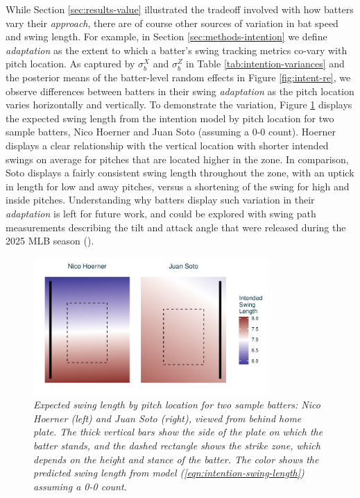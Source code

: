 \documentclass{article}
\begin{document}
    While Section \ref{sec:results-value} illustrated the tradeoff involved with how batters vary their \textit{approach}, there are of course other sources of variation in bat speed and swing length. For example, in Section \ref{sec:methods-intention} we define \textit{adaptation} as the extent to which a batter's swing tracking metrics co-vary with pitch location. As captured by $\sigma_b^X$ and $\sigma_b^Z$ in Table \ref{tab:intention-variances} and the posterior means of the batter-level random effects in Figure \ref{fig:intent-re}, we observe differences between batters in their swing \textit{adaptation} as the pitch location varies horizontally and vertically. To demonstrate the variation, Figure \ref{fig:adaptation} displays the expected swing length from the intention model by pitch location for two sample batters, Nico Hoerner and Juan Soto (assuming a 0-0 count). Hoerner displays a clear relationship with the vertical location with shorter intended swings on average for pitches that are located higher in the zone. In comparison, Soto displays a fairly consistent swing length throughout the zone, with an uptick in length for low and away pitches, versus a shortening of the swing for high and inside pitches. Understanding why batters display such variation in their \textit{adaptation} is left for future work, and could be explored with swing path measurements describing the tilt and attack angle that were released during the 2025 MLB season (\cite{petriello_4_2025}).
    
      \begin{figure}
        \centering
        \includegraphics[width = 0.8\textwidth]{figures/adaptation.pdf}
        \caption{\it Expected swing length by pitch location for two sample batters: Nico Hoerner (left) and Juan Soto (right), viewed from behind home plate. The thick vertical bars show the side of the plate on which the batter stands, and the dashed rectangle shows the strike zone, which depends on the height and stance of the batter. The color shows the predicted swing length  from model (\ref{eqn:intention-swing-length}) assuming a 0-0 count.}
        \label{fig:adaptation}
      \end{figure}
\end{document}
